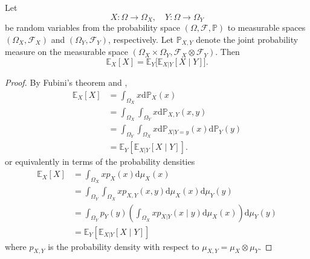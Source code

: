 \begin{theorem}
	\label{theorem:total_expectation}
	Let
	\begin{equation}
		X\colon \Omega \to \Omega_X, \quad Y\colon \Omega \to \Omega_Y
	\end{equation}
	be random variables from the probability space $(\Omega, \mathcal{F}, \mathbb{P})$ to measurable spaces $(\Omega_X, \mathcal{F}_X)$ and $(\Omega_Y, \mathcal{F}_Y)$, respectively. Let $\mathbb{P}_{X,Y}$ denote the joint probability measure on the measurable space $(\Omega_X \times \Omega_Y, \mathcal{F}_X \otimes \mathcal{F}_Y)$. Then
	\begin{equation}
		\mathbb{E}_X[X] = \mathbb{E}_Y\big[\mathbb{E}_{X|Y}[X \mid Y]\big].
	\end{equation}
\end{theorem}

\begin{proof}
	By Fubini's theorem and ,
	\begin{equation}
		\begin{split}
			\mathbb{E}_X[X] 
			&= \int_{\Omega_X} x \mathrm{d}\mathbb{P}_X(x)\\
			&= \int_{\Omega_X}\int_{\Omega_Y} x \mathrm{d}\mathbb{P}_{X,Y}(x,y)\\
			&= \int_{\Omega_Y}\int_{\Omega_X} x \mathrm{d}\mathbb{P}_{X|Y=y}(x)\mathrm{d}\mathbb{P}_Y(y)\\
			&= \mathbb{E}_Y[\mathbb{E}_{X|Y}[X\mid Y]].
		\end{split}
	\end{equation}
	or equivalently in terms of the probability densities
	\begin{equation}
		\begin{split}
			\mathbb{E}_X[X] 
			&= \int_{\Omega_X} x p_X(x) \mathrm{d}\mu_X(x)\\
			&= \int_{\Omega_Y} \int_{\Omega_X} x p_{X,Y}(x,y) \mathrm{d}\mu_X(x) \mathrm{d}\mu_Y(y)\\
			&= \int_{\Omega_Y} p_Y(y) \left( \int_{\Omega_X} x p_{X|Y}(x\mid y) \mathrm{d}\mu_X(x) \right) \mathrm{d}\mu_Y(y)\\
			&= \mathbb{E}_Y[\mathbb{E}_{X|Y}[X\mid Y]]
		\end{split}
	\end{equation}
	where $p_{X,Y}$ is the probability density with respect to $\mu_{X,Y} = \mu_X \otimes \mu_Y$.
\end{proof}

